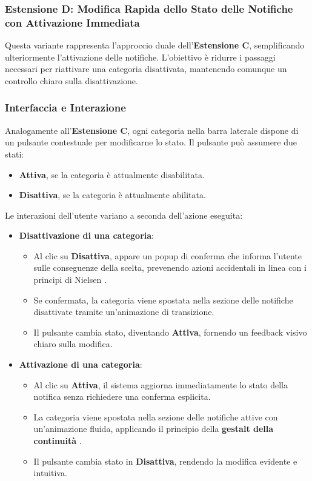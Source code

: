 \clearpage
\newpage

\subsubsection{Estensione D: Modifica Rapida dello Stato delle Notifiche con Attivazione Immediata}

Questa variante rappresenta l’approccio duale dell’\textbf{Estensione C}, semplificando ulteriormente l’attivazione delle notifiche. L’obiettivo è ridurre i passaggi necessari per riattivare una categoria disattivata, mantenendo comunque un controllo chiaro sulla disattivazione.

\vspace{0.5cm}
\subsubsection{Interfaccia e Interazione}
Analogamente all’\textbf{Estensione C}, ogni categoria nella barra laterale dispone di un pulsante contestuale per modificarne lo stato. Il pulsante può assumere due stati:

\begin{itemize}
    \item \textbf{Attiva}, se la categoria è attualmente disabilitata.
    \item \textbf{Disattiva}, se la categoria è attualmente abilitata.
\end{itemize}

Le interazioni dell’utente variano a seconda dell’azione eseguita:

\begin{itemize}
    \item \textbf{Disattivazione di una categoria}:
    \begin{itemize}
        \item Al clic su \textbf{Disattiva}, appare un popup di conferma che informa l’utente sulle conseguenze della scelta, prevenendo azioni accidentali in linea con i principi di Nielsen \cite{nielsen1995}.
        \item Se confermata, la categoria viene spostata nella sezione delle notifiche disattivate tramite un’animazione di transizione.
        \item Il pulsante cambia stato, diventando \textbf{Attiva}, fornendo un feedback visivo chiaro sulla modifica.
    \end{itemize}
    
    \item \textbf{Attivazione di una categoria}:
    \begin{itemize}
        \item Al clic su \textbf{Attiva}, il sistema aggiorna immediatamente lo stato della notifica senza richiedere una conferma esplicita.
        \item La categoria viene spostata nella sezione delle notifiche attive con un’animazione fluida, applicando il principio della \textbf{gestalt della continuità} \cite{miller1956}.
        \item Il pulsante cambia stato in \textbf{Disattiva}, rendendo la modifica evidente e intuitiva.
    \end{itemize}
\end{itemize}

